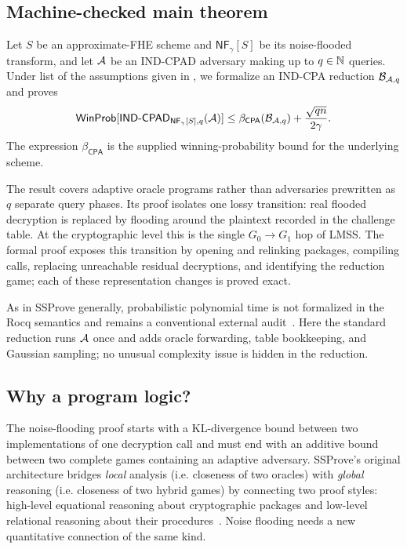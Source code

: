 \subsection{Machine-checked main theorem}
\label{sec:scope}

Let \(S\) be an approximate-FHE scheme and \(\mathsf{NF}_{\gamma}[S]\) be its noise-flooded transform,
and let \(\mathcal{A}\) be an IND-CPAD adversary making up to \(q\in\mathbb{N}\) queries.
Under list of the assumptions given in
, we formalize an IND-CPA reduction \(\mathcal{B}_{\mathcal{A},q}\) and proves
\begin{equation}
\label{eq:headline}
 \mathsf{WinProb}[\mathsf{IND\text{-}CPAD}_{\mathsf{NF}_{\gamma}[S],q}(\mathcal{A})]
 \leq
 \beta_{\mathsf{CPA}}(\mathcal{B}_{\mathcal{A},q})+
 \frac{\sqrt{qn}}{2\gamma}.
\end{equation}
The expression \(\beta_{\mathsf{CPA}}\) is the supplied winning-probability
bound for the underlying scheme.

The result covers adaptive oracle programs rather than adversaries prewritten as \(q\) separate query phases.
Its proof isolates one lossy transition: real flooded decryption is replaced by flooding around the plaintext recorded in the challenge table.
At the cryptographic level this is the single \(G_0\to G_1\) hop of LMSS.
The formal proof exposes this transition by opening and relinking packages,
compiling calls, replacing unreachable residual decryptions, and identifying
the reduction game; each of these representation changes is proved exact.


As in SSProve generally, probabilistic polynomial time is not formalized in the
Rocq semantics and remains a conventional external
audit~\cite{ssprove}.
Here the standard reduction runs \(\mathcal{A}\) once and adds oracle forwarding, table
bookkeeping, and Gaussian sampling; no unusual complexity issue is hidden in
the reduction.

\subsection{Why a program logic?}

The noise-flooding proof starts with a KL-divergence bound between two
implementations of one decryption call and must end with an additive bound
between two complete games containing an adaptive adversary.
SSProve's original architecture bridges \emph{local} analysis (i.e. closeness of two oracles)
with \emph{global} reasoning (i.e. closeness of two hybrid games) by connecting two proof styles:
high-level equational reasoning about
cryptographic packages and low-level relational reasoning about their
procedures~\cite{ssprove}.
Noise flooding needs a new quantitative connection of the same kind.

